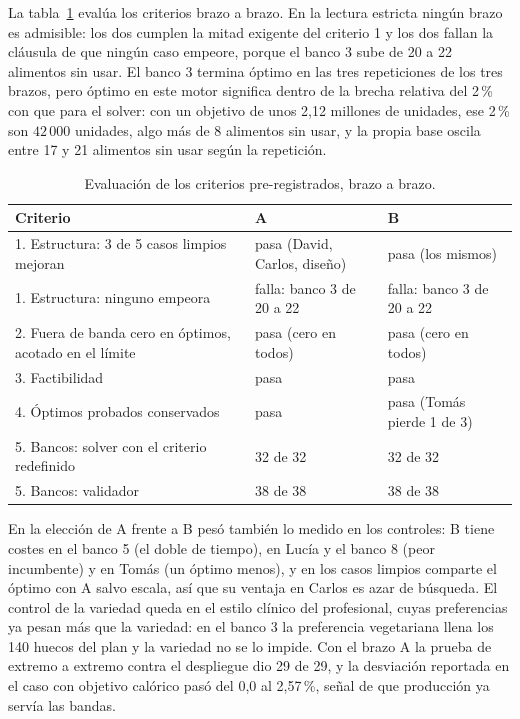 La tabla~\ref{tab:bandasCriterios} evalúa los criterios brazo a brazo. En la lectura estricta ningún brazo es admisible: los dos cumplen la mitad exigente del criterio 1 y los dos fallan la cláusula de que ningún caso empeore, porque el banco 3 sube de 20 a 22 alimentos sin usar. El banco 3 termina óptimo en las tres repeticiones de los tres brazos, pero óptimo en este motor significa dentro de la brecha relativa del 2\,\% con que para el solver: con un objetivo de unos 2,12 millones de unidades, ese 2\,\% son $42\,000$ unidades, algo más de 8 alimentos sin usar, y la propia base oscila entre 17 y 21 alimentos sin usar según la repetición.

\begin{table}[htbp]
\centering
\small
\begin{tabular}{|p{6.2cm}|p{3.4cm}|p{3.4cm}|}
\hline
\textbf{Criterio} & \textbf{A} & \textbf{B} \\
\hline
1. Estructura: 3 de 5 casos limpios mejoran & pasa (David, Carlos, diseño) & pasa (los mismos) \\
\hline
1. Estructura: ninguno empeora & falla: banco 3 de 20 a 22 & falla: banco 3 de 20 a 22 \\
\hline
2. Fuera de banda cero en óptimos, acotado en el límite & pasa (cero en todos) & pasa (cero en todos) \\
\hline
3. Factibilidad & pasa & pasa \\
\hline
4. Óptimos probados conservados & pasa & pasa (Tomás pierde 1 de 3) \\
\hline
5. Bancos: solver con el criterio redefinido & 32 de 32 & 32 de 32 \\
\hline
5. Bancos: validador & 38 de 38 & 38 de 38 \\
\hline
\end{tabular}
\caption{Evaluación de los criterios pre-registrados, brazo a brazo.}
\label{tab:bandasCriterios}
\end{table}

En la elección de A frente a B pesó también lo medido en los controles: B tiene costes en el banco 5 (el doble de tiempo), en Lucía y el banco 8 (peor incumbente) y en Tomás (un óptimo menos), y en los casos limpios comparte el óptimo con A salvo escala, así que su ventaja en Carlos es azar de búsqueda. El control de la variedad queda en el estilo clínico del profesional, cuyas preferencias ya pesan más que la variedad: en el banco 3 la preferencia vegetariana llena los 140 huecos del plan y la variedad no se lo impide. Con el brazo A la prueba de extremo a extremo contra el despliegue dio 29 de 29, y la desviación reportada en el caso con objetivo calórico pasó del 0,0 al 2,57\,\%, señal de que producción ya servía las bandas.

